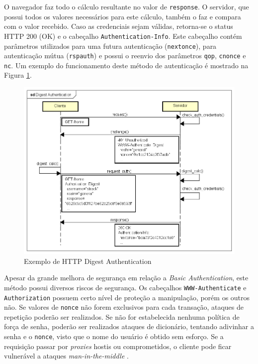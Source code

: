 \documentclass[12pt]{article}
\begin{document}
O navegador faz todo o cálculo resultante no valor de \texttt{response}. O servidor, que possui todos os valores necessários para este cálculo, também o faz e compara com o valor recebido. Caso as credenciais sejam válidas, retorna-se o status HTTP 200 (OK) e o cabeçalho \texttt{Authentication-Info}. Este cabeçalho contém parâmetros utilizados para uma futura autenticação (\texttt{nextonce}), para autenticação mútua (\texttt{rspauth}) e possui o reenvio dos parâmetros \texttt{qop}, \texttt{cnonce} e \texttt{nc}. Um exemplo do funcionamento deste método de autenticação é mostrado na Figura \ref{fig:digestAuth}.

\begin{figure}[ht]
  \centering
  \includegraphics[width=1\textwidth]{Digest Authentication (Simplified).png}
  \caption{Exemplo de HTTP Digest Authentication}
  \label{fig:digestAuth}
\end{figure}

Apesar da grande melhora de segurança em relação a \emph{Basic Authentication}, este método possui diversos riscos de segurança. Os cabeçalhos \texttt{WWW-Authenticate} e \texttt{Authorization} possuem certo nível de proteção a manipulação, porém os outros não. Se valores de \texttt{nonce} não forem exclusivos para cada transação, ataques de repetição poderão ser realizados. Se não for estabelecida nenhuma política de força de senha, poderão ser realizados ataques de dicionário, tentando adivinhar a senha e o \texttt{nonce}, visto que o nome do usuário é obtido sem esforço.
Se a requisição passar por \emph{proxies} hostis ou comprometidos, o cliente pode ficar vulnerável a ataques \emph{man-in-the-middle} \cite{GOURLEY2002}.
\end{document}
